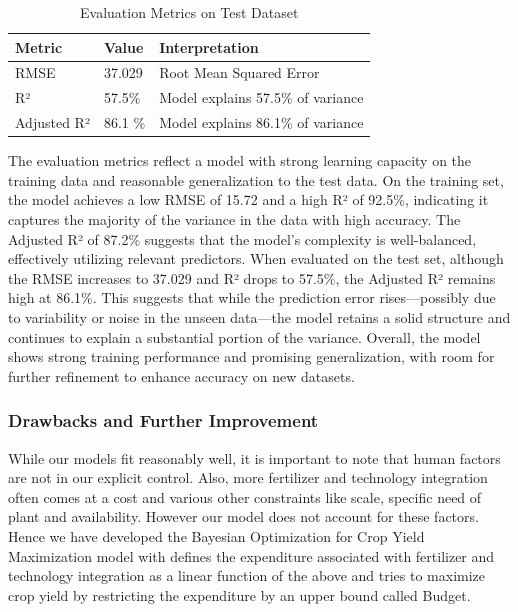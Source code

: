 \begin{table}[h]
\centering
\caption{Evaluation Metrics on Test Dataset}
\begin{tabular}{lll}
\toprule
\textbf{Metric} & \textbf{Value} & \textbf{Interpretation} \\
\midrule
RMSE & 37.029 & Root Mean Squared Error \\
R² & 57.5\% & Model explains 57.5\% of variance\\
Adjusted R² & 86.1 \%  & Model explains 86.1\% of variance\\
\bottomrule
\end{tabular}
\end{table}

The evaluation metrics reflect a model with strong learning capacity on the training data and reasonable generalization to the test data. On the training set, the model achieves a low RMSE of 15.72 and a high R² of 92.5\%, indicating it captures the majority of the variance in the data with high accuracy. The Adjusted R² of 87.2\% suggests that the model's complexity is well-balanced, effectively utilizing relevant predictors. When evaluated on the test set, although the RMSE increases to 37.029 and R² drops to 57.5\%, the Adjusted R² remains high at 86.1\%. This suggests that while the prediction error rises—possibly due to variability or noise in the unseen data—the model retains a solid structure and continues to explain a substantial portion of the variance. Overall, the model shows strong training performance and promising generalization, with room for further refinement to enhance accuracy on new datasets.

\subsubsection{Drawbacks and Further Improvement}

While our models fit reasonably well, it is important to note that human factors are not in our explicit control. Also, more fertilizer and technology integration often comes at a cost and various other constraints like scale, specific need of plant and availability. However our model does not account for these factors. Hence we have developed the Bayesian Optimization for Crop Yield Maximization model with defines the expenditure associated with fertilizer and technology integration as a linear function of the above and tries to maximize crop yield by restricting the expenditure by an upper bound called Budget.  



